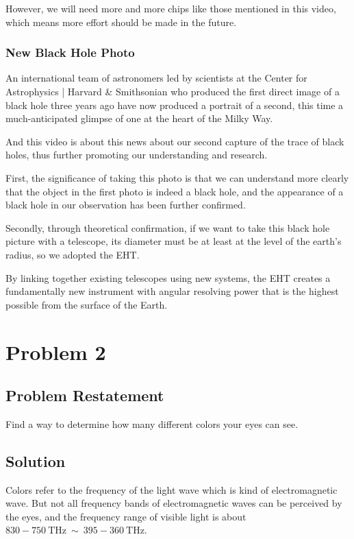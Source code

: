 \documentclass{article}
\begin{document}
However, we will need more and more chips like those mentioned in this video, which means more effort should be made in the future.

\subsubsection{New Black Hole Photo}

An international team of astronomers led by scientists at the Center for Astrophysics | Harvard \& Smithsonian who produced the first direct image of a black hole three years ago have now produced a portrait of a second, this time a much-anticipated glimpse of one at the heart of the Milky Way.\cite{second-black-hole-image}

And this video is about this news about our second capture of the trace of black holes, thus further promoting our understanding and research.

First, the significance of taking this photo is that we can understand more clearly that the object in the first photo is indeed a black hole, and the appearance of a black hole in our observation has been further confirmed.

Secondly, through theoretical confirmation, if we want to take this black hole picture with a telescope, its diameter must be at least at the level of the earth's radius, so we adopted the EHT. 

By linking together existing telescopes using new systems, the EHT creates a fundamentally new instrument with angular resolving power that is the highest possible from the surface of the Earth.

\section{Problem 2}

\subsection{Problem Restatement}

Find a way to determine how many different colors your eyes can see.

\subsection{Solution}

Colors refer to the frequency of the light wave which is kind of electromagnetic wave. But not all frequency bands of electromagnetic waves can be perceived by the eyes, and the frequency range of visible light is about $830 - 750~\mathrm{THz} ~\sim ~ 395 - 360 ~\mathrm{THz}$.
\end{document}
